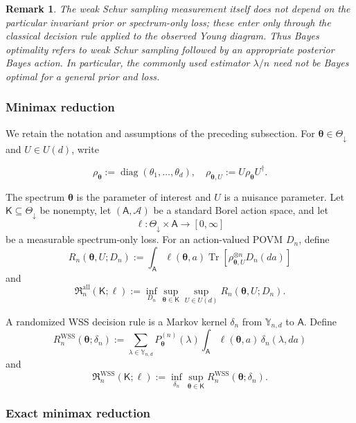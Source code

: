 \documentclass{article}
\newtheorem{remark}{Remark}
\theoremstyle{named}
\theoremstyle{named1}
\newcommand{\Tr}{\operatorname{Tr}}
\newcommand{\diag}{\operatorname{diag}}
\newcommand{\WSS}{\mathrm{WSS}}
\newcommand{\btheta}{\boldsymbol{\theta}}
\theoremstyle{plain}
\theoremstyle{remark}
\begin{document}
\begin{remark}
The weak Schur sampling measurement itself does not depend on the
particular invariant prior or spectrum-only loss; these enter only through
the classical decision rule applied to the observed Young diagram.
Thus Bayes optimality refers to weak Schur sampling followed by an
appropriate posterior Bayes action. In particular, the commonly used
estimator $\lambda/n$ need not be Bayes optimal for a general prior and loss.
\end{remark}







\subsubsection{Minimax reduction}
\label{sec:wss-minimax}

We retain the notation and assumptions of the preceding subsection.
For \(\btheta\in\Theta_{\downarrow}\) and \(U\in U(d)\), write


\[
\rho_{\btheta}:=\diag(\theta_1,\ldots,\theta_d), \quad   \rho_{\btheta,U}:=U\rho_{\btheta}U^{\dagger}.
\]


The spectrum \(\btheta\) is the parameter of interest and \(U\) is a
nuisance parameter. Let \(\mathsf K\subseteq\Theta_{\downarrow}\) be nonempty, let
\((\mathsf A,\mathcal A)\) be a standard Borel action space, and let
\[
    \ell:\Theta_{\downarrow}\times\mathsf A\rightarrow[0,\infty]
\] 
be a measurable spectrum-only loss. For an action-valued POVM \(D_n\),
define
\[
    R_n(\btheta,U;D_n)
    :=\int_{\mathsf A}\ell(\btheta,a)
      \Tr\!\left[\rho_{\btheta,U}^{\otimes n}D_n(da)\right]
\]
and
\[
    \mathfrak R_n^{\mathrm{all}}(\mathsf K;\ell)
    :=\inf_{D_n}\sup_{\btheta\in\mathsf K}\sup_{U\in U(d)}
      R_n(\btheta,U;D_n).
\]

A randomized WSS decision rule is a Markov kernel \(\delta_n\) from
\(\mathbb Y_{n,d}\) to \(\mathsf A\). Define
\[
    R_n^{\WSS}(\btheta;\delta_n)
    :=\sum_{\lambda\in\mathbb Y_{n,d}}
      P_{\btheta}^{(n)}(\lambda)
      \int_{\mathsf A}\ell(\btheta,a)\,\delta_n(\lambda,da)
\]
and
\[
    \mathfrak R_n^{\WSS}(\mathsf K;\ell)
    :=\inf_{\delta_n}\sup_{\btheta\in\mathsf K}
      R_n^{\WSS}(\btheta;\delta_n).
\]

\subsubsection{Exact minimax reduction}
\end{document}
